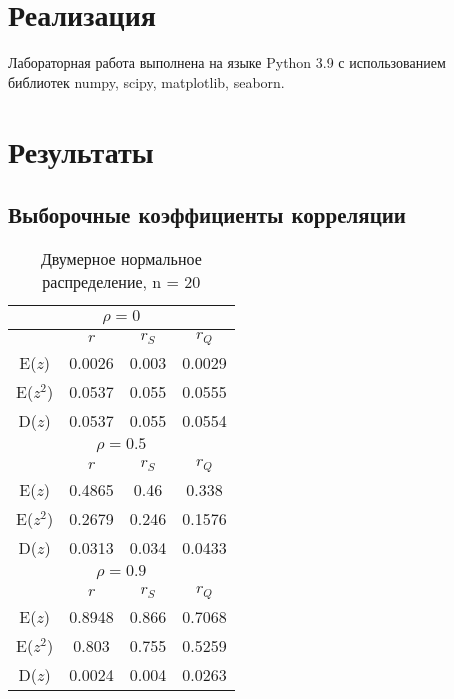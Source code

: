 \documentclass[a4paper,12pt]{article} %
\begin{document}
\section{Реализация}
Лабораторная работа выполнена на языке Python 3.9 с использованием библиотек numpy, scipy, matplotlib, seaborn.
\section{Результаты}
\subsection{Выборочные коэффициенты корреляции}
\begin{table}[H]
    \centering
    \begin{tabular}{|c|c|c|c|}
\hline
\multicolumn{4}{|c|}{$\rho=0$}\\
\hline
&$r$&$r_S$&$r_Q$\\
\hline
E($z$)&0.0026&0.003&0.0029\\
\hline
E($z^2$)&0.0537&0.055&0.0555\\
\hline
D($z$)&0.0537&0.055&0.0554\\
\hline
\multicolumn{4}{|c|}{$\rho=0.5$}\\
\hline
&$r$&$r_S$&$r_Q$\\
\hline
E($z$)&0.4865&0.46&0.338\\
\hline
E($z^2$)&0.2679&0.246&0.1576\\
\hline
D($z$)&0.0313&0.034&0.0433\\
\hline
\multicolumn{4}{|c|}{$\rho=0.9$}\\
\hline
&$r$&$r_S$&$r_Q$\\
\hline
E($z$)&0.8948&0.866&0.7068\\
\hline
E($z^2$)&0.803&0.755&0.5259\\
\hline
D($z$)&0.0024&0.004&0.0263\\
\hline
\end{tabular}
    \caption{Двумерное нормальное распределение, n = 20}
    \label{tab:norm_n_20}
\end{table}
\end{document}
